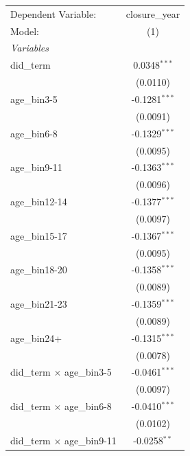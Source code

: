 
\begingroup
\centering
\begin{tabular}{lc}
   \tabularnewline \midrule \midrule
   Dependent Variable:                 & closure\_year\\   
   Model:                              & (1)\\  
   \midrule
   \emph{Variables}\\
   did\_term                           & 0.0348$^{***}$\\   
                                       & (0.0110)\\   
   age\_bin3-5                         & -0.1281$^{***}$\\   
                                       & (0.0091)\\   
   age\_bin6-8                         & -0.1329$^{***}$\\   
                                       & (0.0095)\\   
   age\_bin9-11                        & -0.1363$^{***}$\\   
                                       & (0.0096)\\   
   age\_bin12-14                       & -0.1377$^{***}$\\   
                                       & (0.0097)\\   
   age\_bin15-17                       & -0.1367$^{***}$\\   
                                       & (0.0095)\\   
   age\_bin18-20                       & -0.1358$^{***}$\\   
                                       & (0.0089)\\   
   age\_bin21-23                       & -0.1359$^{***}$\\   
                                       & (0.0089)\\   
   age\_bin24+                         & -0.1315$^{***}$\\   
                                       & (0.0078)\\   
   did\_term $\times$ age\_bin3-5      & -0.0461$^{***}$\\   
                                       & (0.0097)\\   
   did\_term $\times$ age\_bin6-8      & -0.0410$^{***}$\\   
                                       & (0.0102)\\   
   did\_term $\times$ age\_bin9-11     & -0.0258$^{**}$\\   

\end{tabular}
